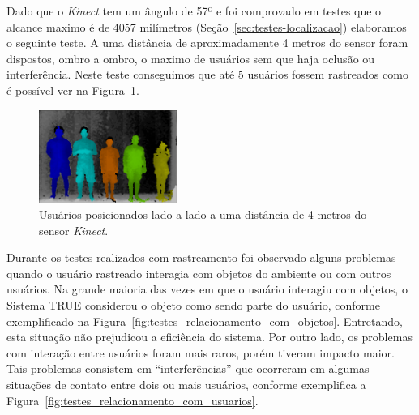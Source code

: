 	Dado que o \textit{Kinect} tem um ângulo de 57º e foi comprovado em testes
	que o alcance maximo é de 4057 milímetros (Seção~\ref{sec:testes-localizacao})
	elaboramos o seguinte teste. A uma distância de aproximadamente 4 metros do
	sensor foram dispostos, ombro a ombro, o maximo de usuários sem que
	haja oclusão ou interferência. Neste teste conseguimos que até 5 usuários
	fossem rastreados como é possível ver na Figura~\ref{fig:max-pessoas}.

	
	

	\begin{figure}[htb]
		\begin{center}
			\includegraphics[width=0.4\textwidth]{figuras/5.Testes/oclusao/max-pessoas.png}
		\end{center}
		\caption{Usuários posicionados lado a lado a uma distância de 4 metros do
		sensor \textit{Kinect}.}
		\label{fig:max-pessoas}
	\end{figure}
		
	Durante os testes realizados com rastreamento foi observado alguns problemas
	quando o usuário rastreado interagia com objetos do ambiente ou com outros
	usuários. Na grande maioria das vezes em que o usuário interagiu com objetos, o
	Sistema TRUE considerou o objeto como sendo parte do usuário, conforme
	exemplificado na Figura~\ref{fig:testes_relacionamento_com_objetos}. Entretando,
	esta situação não prejudicou a eficiência do sistema. Por outro lado, os
	problemas com interação entre usuários foram mais raros, porém tiveram impacto
	maior. Tais problemas consistem em ``interferências'' que ocorreram em algumas
	situações de contato entre dois ou mais usuários, conforme exemplifica a
	Figura~\ref{fig:testes_relacionamento_com_usuarios}.
	
